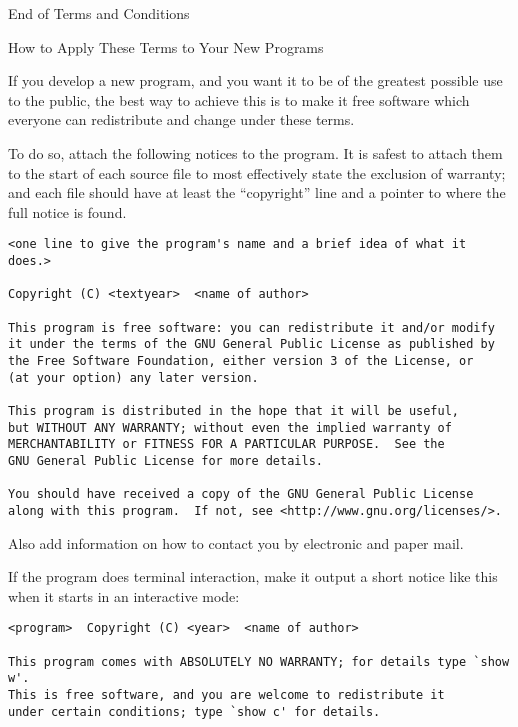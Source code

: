 {\begin{enumerate}
\begin{center}
{\Large\sc End of Terms and Conditions}

\bigskip
How to Apply These Terms to Your New Programs
\end{center}

If you develop a new program, and you want it to be of the greatest
possible use to the public, the best way to achieve this is to make it
free software which everyone can redistribute and change under these terms.

To do so, attach the following notices to the program.  It is safest
to attach them to the start of each source file to most effectively
state the exclusion of warranty; and each file should have at least
the ``copyright'' line and a pointer to where the full notice is found.

{\footnotesize
\begin{verbatim}
<one line to give the program's name and a brief idea of what it does.>

Copyright (C) <textyear>  <name of author>

This program is free software: you can redistribute it and/or modify
it under the terms of the GNU General Public License as published by
the Free Software Foundation, either version 3 of the License, or
(at your option) any later version.

This program is distributed in the hope that it will be useful,
but WITHOUT ANY WARRANTY; without even the implied warranty of
MERCHANTABILITY or FITNESS FOR A PARTICULAR PURPOSE.  See the
GNU General Public License for more details.

You should have received a copy of the GNU General Public License
along with this program.  If not, see <http://www.gnu.org/licenses/>.
\end{verbatim}
}

Also add information on how to contact you by electronic and paper mail.

If the program does terminal interaction, make it output a short
notice like this when it starts in an interactive mode:

{\footnotesize
\begin{verbatim}
<program>  Copyright (C) <year>  <name of author>

This program comes with ABSOLUTELY NO WARRANTY; for details type `show w'.
This is free software, and you are welcome to redistribute it
under certain conditions; type `show c' for details.
\end{verbatim}
}


\end{enumerate}}
